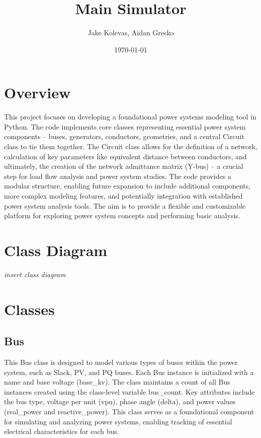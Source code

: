 \documentclass{article}
\author{Jake Kolevas, Aidan Gresko}
\title{Main Simulator}
\date{\today}
\begin{document}
	\maketitle
	
	\section{Overview}
	This project focuses on developing a foundational power systems modeling tool in Python. The code implements core classes representing essential power system components – buses, generators, conductors, geometries, and a central Circuit class to tie them together. The Circuit class allows for the definition of a network, calculation of key parameters like equivalent distance between conductors, and ultimately, the creation of the network admittance matrix (Y-bus) – a crucial step for load flow analysis and power system studies. The code provides a modular structure, enabling future expansion to include additional components, more complex modeling features, and potentially integration with established power system analysis tools. The aim is to provide a flexible and customizable platform for exploring power system concepts and performing basic analysis.
	
	\section{Class Diagram}
	
	\textit{insert class diagram}
	
	\section{Classes}
	
	\subsection{Bus}
	This Bus class is designed to model various types of buses within the power system, such as Slack, PV, and PQ buses. Each Bus instance is initialized with a name and base voltage (base\_kv). The class maintains a count of all Bus instances created using the class-level variable bus\_count. Key attributes include the bus type, voltage per unit (vpu), phase angle (delta), and power values (real\_power and reactive\_power). This class serves as a foundational component for simulating and analyzing power systems, enabling tracking of essential electrical characteristics for each bus.
	
\end{document}
